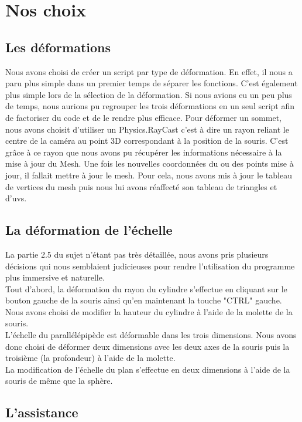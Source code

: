 \documentclass[a4paper,oneside,12pt,titlepage]{article}
\begin{document}
\section{Nos choix}

\subsection{Les déformations}

Nous avons choisi de créer un script par type de déformation. En effet, il nous a paru plus simple dans un premier temps de séparer les fonctions. C'est également plus simple lors de la sélection de la déformation. Si nous avions eu un peu plus de temps, nous aurions pu regrouper les trois déformations en un seul script afin de factoriser du code et de le rendre plus efficace.
Pour déformer un sommet, nous avons choisit d'utiliser un Physics.RayCast c'est à dire un rayon reliant le centre de la caméra au point 3D correspondant à la position de la souris. C'est grâce à ce rayon que nous avons pu récupérer les informations nécessaire à la mise à jour du Mesh. Une fois les nouvelles coordonnées du ou des points mise à jour, il fallait mettre à jour le mesh. Pour cela, nous avons mis à jour le tableau de vertices du mesh puis nous lui avons réaffecté son tableau de triangles et d'uvs. 

\subsection{La déformation de l'échelle}

La partie 2.5 du sujet n'étant pas très détaillée, nous avons pris plusieurs décisions qui nous semblaient judicieuses pour rendre l'utilisation du programme plus immersive et naturelle.\\
Tout d'abord, la déformation du rayon du cylindre s'effectue en cliquant sur le bouton gauche de la souris ainsi qu'en maintenant la touche "CTRL" gauche. Nous avons choisi de modifier la hauteur du cylindre à l'aide de la molette de la souris.\\ 
L'échelle du parallélépipède est déformable dans les trois dimensions. Nous avons donc choisi de déformer deux dimensions avec les deux axes de la souris puis la troisième (la profondeur) à l'aide de la molette.\\
La modification de l'échelle du plan s'effectue en deux dimensions à l'aide de la souris de même que la sphère. 
\subsection{L'assistance}
\end{document}
